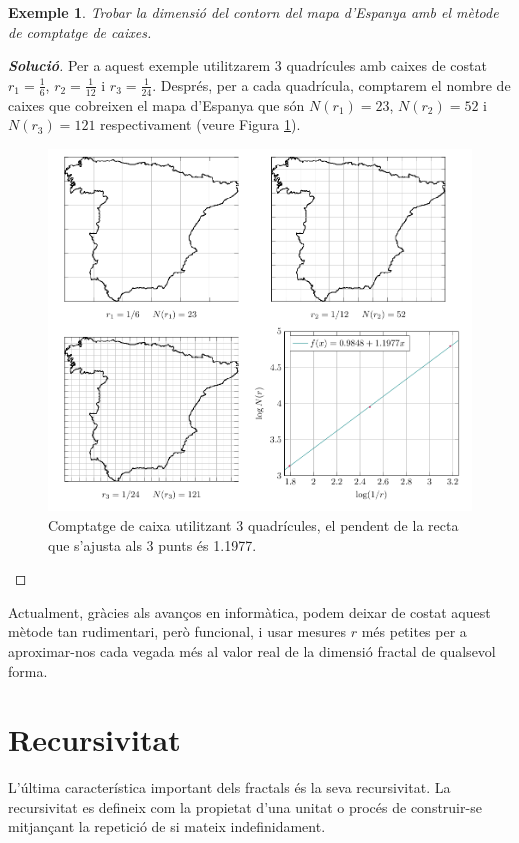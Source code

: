 \documentclass[12pt,a4paper]{report}
\newtheorem{eje}{Exemple}[chapter]
\newcommand*{\myproofname}{\textbf{Solució}}
\newenvironment{myproof}[1][\myproofname]{\begin{proof}[#1]\renewcommand*{\qedsymbol}{\(\blacksquare\)}}{\end{proof}}
\begin{document}
\newpage
\begin{eje}
Trobar la dimensió del contorn del mapa d'Espanya amb el mètode de comptatge de caixes.
\end{eje}
\begin{myproof}
Per a aquest exemple  utilitzarem  3 quadrícules  amb caixes de costat $r_1=\displaystyle\frac{1}{6}$, $r_2=\displaystyle\frac{1}{12}$ i  $r_3=\displaystyle\frac{1}{24}$. Després, per a cada quadrícula, comptarem el nombre de caixes que cobreixen el mapa d'Espanya que són $N(r_1)=23$, $N(r_2)=52$ i $N(r_3)=121$ respectivament (veure Figura \ref{img03_dim_country}). 

\begin{figure}[!ht]
\centering
\includegraphics[width=.75\textwidth]{img/img02_dim_country.pdf} 
\caption{Comptatge de caixa utilitzant 3 quadrícules, el pendent de la recta que s'ajusta als 3 punts és 1.1977.}
\label{img03_dim_country}
\end{figure}
\end{myproof}
\newpage
Actualment, gràcies als avanços en informàtica, podem deixar de costat aquest mètode tan rudimentari, però funcional, i usar mesures $r$ més petites per a aproximar-nos cada vegada més al valor real de la dimensió fractal de qualsevol forma. 

\begin{small}

\end{small}
\section{Recursivitat}
L'última característica important dels fractals és la seva recursivitat. La recursivitat es defineix com la propietat d'una unitat o procés de construir-se mitjançant la repetició de si mateix indefinidament.
\end{document}
